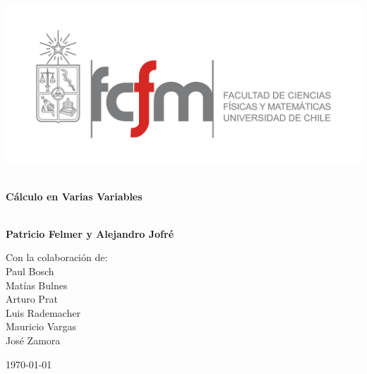 \begin{titlepage}

\begin{center}

\includegraphics[scale=0.3]{figuras/escudo2.pdf}\\[0.5cm]    



\vspace{2cm}

\HRule \\[0.4cm]
{\Huge \textbf{C\'alculo en Varias Variables}}\\[0.4cm]

\HRule \\[3cm]

\large{\textbf{Patricio Felmer y Alejandro Jofr\'e}

\vspace{1cm}

Con la colaboraci\'on de:\\
Paul Bosch\\
Mat\'ias Bulnes\\
Arturo Prat\\
Luis Rademacher\\Mauricio Vargas
\\Jos\'e Zamora}

\vspace{1cm}

\vfill

{\large \today}

\end{center}
\end{titlepage}